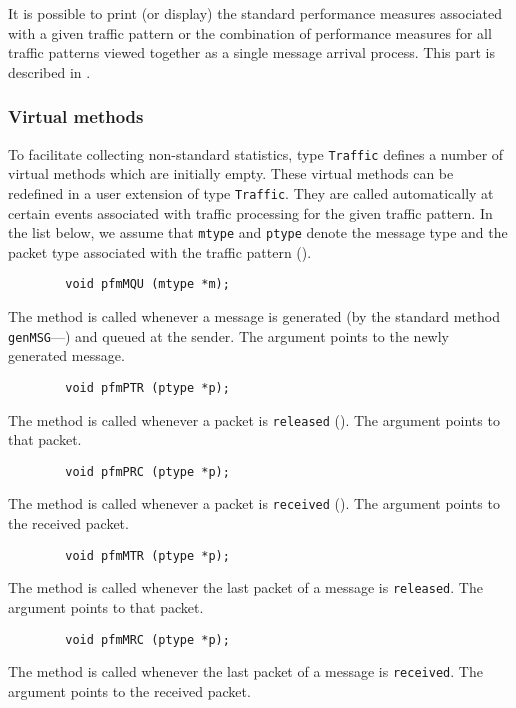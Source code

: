 It is possible to print (or display)
the standard performance measures associated
with a given traffic pattern or the combination of performance measures
for all traffic patterns viewed together as a single message arrival
process.
This part is described in .

\subsubsection{Virtual methods}
\label{rm_pm_cl_vm}

To facilitate collecting non-standard statistics, type {\tt Traffic} defines
a number of virtual methods which are initially empty.
These virtual
methods can be redefined in a user extension of type {\tt Traffic}.
They are called automatically at certain events associated with
traffic processing for the given traffic pattern.
In the list below, we assume that {\tt mtype} and {\tt ptype} denote the
message type and the packet type associated with the traffic pattern
().

\begin{verbatim}
        void pfmMQU (mtype *m);
\end{verbatim}
The method is called whenever a message is generated (by the standard method
{\tt genMSG}---) and queued at the sender.
The argument points to the newly generated message.   

\begin{verbatim}
        void pfmPTR (ptype *p);
\end{verbatim}
The method is called whenever a packet is {\tt released}
().
The argument points to that packet.

\begin{verbatim}
        void pfmPRC (ptype *p);
\end{verbatim}
The method is called whenever a packet is {\tt received}
().
The argument points to the received packet.

\begin{verbatim}
        void pfmMTR (ptype *p);
\end{verbatim}
The method is called whenever the last packet of a message is {\tt released}.
The argument points to that packet.

\begin{verbatim}
        void pfmMRC (ptype *p);
\end{verbatim}
The method is called whenever the last packet of a message is {\tt received}.
The argument points to the received packet.

